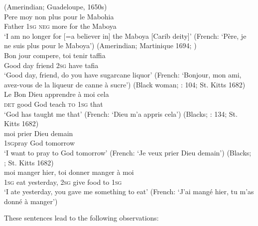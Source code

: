 \documentclass[output=paper,colorlinks,citecolor=brown]{langscibook}
\begin{document}
\ea\label{ex:bakker:9}(Amerindian; Guadeloupe, 1650s)\\
\gll Pere moy non plus pour le Mabohia\\
Father 1\textsc{sg neg} more for the Maboya\\
\glt `I am no longer for [=a believer in] the Maboya [Carib deity]' (French: ‘Père, je ne suis plus pour le Maboya’)
\ex\label{ex:bakker:10}
(Amerindian; Martinique 1694; \citealt[29]{Labat1724_tome1})\\
\gll Bon jour compere, toi tenir taffia \\
Good day friend 2\textsc{sg} have tafia\\
\glt `Good day, friend, do you have sugarcane liquor' (French: ‘Bonjour, mon ami, avez-vous de la liqueur de canne à sucre’)
\ex\label{ex:bakker:11}
 (Black woman; \citet{Chatillon1984}: 104; St. Kitts 1682)\\
\gll Le Bon Dieu apprendre \`{a} moi cela\\
\textsc{det} good God teach \textsc{to} 1\textsc{sg} that\\
\glt `God has taught me that' (French: ‘Dieu m’a appris cela’)
\ex\label{ex:bakker:12}
 (Blacks; \citet{Chatillon1984}: 134; St. Kitts 1682)\\
\gll moi prier Dieu demain\\
1\textsc{sg}pray God tomorrow\\
\glt `I want to pray to God tomorrow' (French: `Je veux prier Dieu demain')
\ex\label{ex:bakker:13}
(Blacks; \citet[134]{Chatillon1984}; St. Kitts 1682)\\
\gll moi manger hier, toi donner manger à moi \\
1\textsc{sg} eat yesterday, 2\textsc{sg} give food to 1\textsc{sg}\\
\glt `I ate yesterday, you gave me something to eat' (French: ‘J'ai mangé hier, tu m'as donné à manger’)\\
\z

These sentences lead to the following observations:
\end{document}
